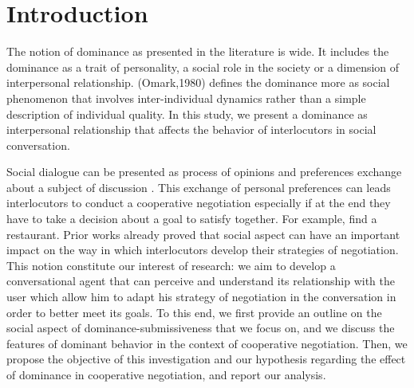 \documentclass{llncs}
\begin{document}
\title{\vskip -10pt}

\author{Lydia Ould Ouali, Charles Rich \and
Nicolas Sabouret }

\maketitle 
\begin{abstract}\vskip -20pt
  
\end{abstract}

\section{Introduction}
The notion of dominance as presented in the literature is wide. It includes the dominance as a trait of personality, a social role in the society or a dimension of interpersonal relationship. (Omark,1980) defines the dominance more as social phenomenon that involves inter-individual dynamics rather than a simple description of individual quality. In this study, we present a dominance as interpersonal relationship that affects the behavior of interlocutors in social conversation. 

\par Social dialogue can be presented as process of opinions and preferences exchange about a subject of discussion \cite{laver1981linguistic}. This exchange of personal preferences  can leads interlocutors to conduct a cooperative negotiation especially if at the end they have to take a decision about a goal to satisfy together. For example, find a restaurant. Prior works already proved that social aspect can have an important impact on the way in which interlocutors  develop their strategies of negotiation. This notion constitute our interest of research: we aim to develop a conversational agent that can perceive and understand its relationship with the user which allow him to adapt his strategy of negotiation in the conversation in order to better meet its goals. To this end, we first provide an outline on the social aspect of dominance-submissiveness that we focus on, and we discuss the features of dominant behavior in the context of cooperative negotiation. Then, we propose the objective of this investigation and our hypothesis regarding the effect of dominance in cooperative negotiation, and report our analysis. 
\end{document}
